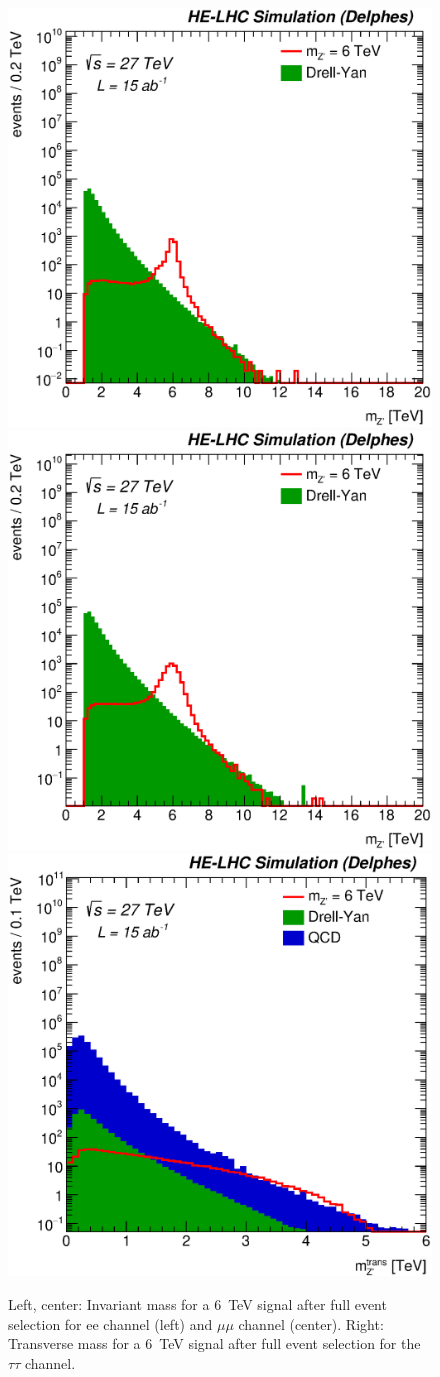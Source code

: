 \documentclass{cernrep}
\begin{document}
\begin{figure}
  \centering
  \includegraphics[width=0.30\columnwidth]{Fig/27tev/Zpee_mzp_sel0_nostack_log.eps}
  \includegraphics[width=0.30\columnwidth]{Fig/27tev/Zpmumu_mzp_sel0_nostack_log.eps}
  \includegraphics[width=0.30\columnwidth]{Fig/27tev/Zptautau_mt_sel0_nostack_log.eps}
  \caption{Left, center: Invariant mass for a 6~TeV signal after full event selection for ee channel (left) and $\mu\mu$ channel (center). Right: Transverse mass for a 6~TeV signal after full event selection for the $\tau\tau$ channel. }
  \label{figure:leptonicresonances27:masses}
\end{figure}
\end{document}
